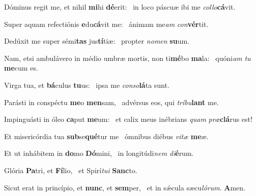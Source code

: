 \item Dóminus regit me, et nihil \textbf{mi}hi \textbf{dé}erit:~\psstar{} in loco páscuæ ibi me \textit{col}\textit{lo}\textbf{cá}vit.
\item Super aquam refectiónis \textbf{e}du\textbf{cá}vit me:~\psstar{} ánimam me\textit{am} \textit{con}\textbf{vér}tit.
\item Dedúxit me super sémi\textbf{tas} jus\textbf{tí}tiæ:~\psstar{} propter \textit{no}\textit{men} \textbf{su}um.
\item Nam, etsi ambulávero in médio umbræ mortis, non ti\textbf{mé}bo \textbf{ma}la:~\psstar{} quóni\textit{am} \textit{tu} \textbf{me}cum es.
\item Virga tua, et \textbf{bá}culus \textbf{tu}us:~\psstar{} ipsa me \textit{con}\textit{so}\textbf{lá}ta sunt.
\item Parásti in conspéctu \textbf{me}o \textbf{men}sam,~\psstar{} advérsus eos, qui \textit{trí}\textit{bu}\textbf{lant} me.
\item Impinguásti in óleo \textbf{ca}put \textbf{me}um:~\psstar{} et calix meus inébrians \textit{quam} \textit{præ}\textbf{clá}rus est!
\item Et misericórdia tua \textbf{sub}se\textbf{qué}\-tur me~\psstar{} ómnibus diébus \textit{vi}\textit{tæ} \textbf{me}æ.
\item Et ut inhábitem in \textbf{do}mo \textbf{Dó}mini,~\psstar{} in longitúdi\textit{nem} \textit{di}\textbf{é}rum.
\item Glória \textbf{Pa}tri, et \textbf{Fí}lio,~\psstar{} et Spirí\textit{tu}\textit{i} \textbf{Sanc}to.
\item Sicut erat in princípio, et \textbf{nunc}, et \textbf{sem}per,~\psstar{} et in sǽcula sæcu\textit{ló}\textit{rum}. \textbf{A}men.
